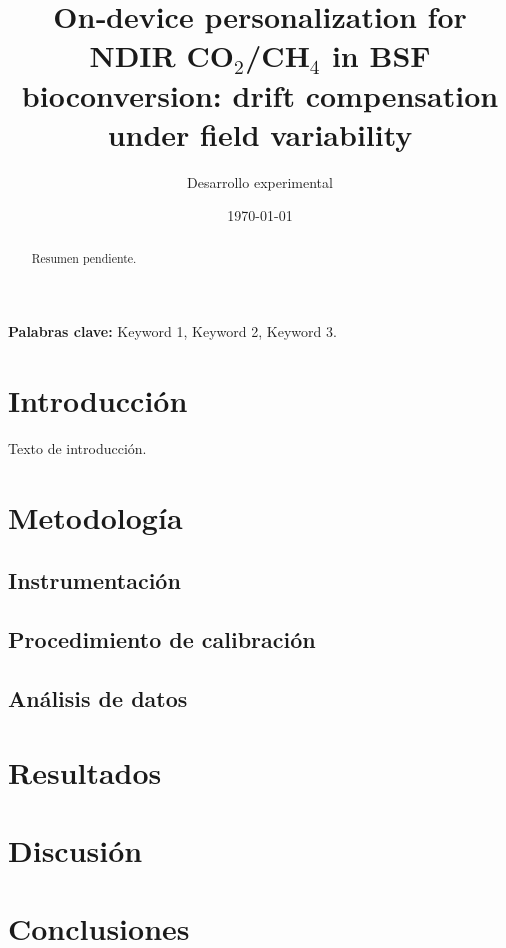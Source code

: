 \documentclass[11pt,a4paper]{article}
\title{On‑device personalization for NDIR CO$_2$/CH$_4$ in BSF bioconversion: drift compensation under field variability}
\author{Desarrollo experimental}
\date{\today}
\begin{document}
\maketitle

\begin{abstract}
Resumen pendiente.
\end{abstract}

\vspace{0.5cm}
\noindent \textbf{Palabras clave:} Keyword 1, Keyword 2, Keyword 3.
\section{Introducción}
Texto de introducción.

\section{Metodología}
\subsection{Instrumentación}
\subsection{Procedimiento de calibración}
\subsection{Análisis de datos}

\section{Resultados}
\section{Discusión}
\section{Conclusiones}

\printbibliography
\end{document}
